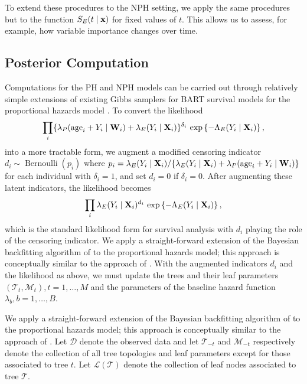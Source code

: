 \documentclass[12pt]{article}
\newcommand{\Bernoulli}{\operatorname{Bernoulli}}
\newcommand{\Data}{\mathcal D}
\newcommand{\Leaves}{\mathcal L}
\newcommand{\sM}{\mathcal M}
\newcommand{\Tree}{\mathcal T}
\newcommand{\bfW}{{\bf W}}
\newcommand{\bfX}{{\bf X}}
\newcommand{\bfx}{{\bf x}}
\begin{document}
To extend these procedures to the NPH setting, we apply the same procedures but to the function $S_E(t \mid \bfx)$ for fixed values of $t$. This allows us to assess, for example, how variable importance changes over time.

\subsection{Posterior Computation}
Computations for the PH and NPH models can be carried out through relatively
simple extensions of existing Gibbs samplers for BART survival models for the
proportional hazards model \citet{basak2021algorithm}. To convert the likelihood
$$
  \prod_i \{\lambda_P(\text{age}_i + Y_i \mid \bfW_i) + \lambda_E(Y_i \mid \bfX_i)\}^{\delta_i}
  \, \exp\left\{-\Lambda_E(Y_i \mid \bfX_i)\right\},
$$
into a more tractable form, we augment a modified censoring indicator $d_i \sim
\Bernoulli(p_i)$ where $p_i = \lambda_E(Y_i \mid \bfX_i) / \{\lambda_E(Y_i \mid
\bfX_i) + \lambda_P(\text{age}_i + Y_i \mid \bfW_i)\}$ for each individual with $\delta_i = 1$, and
set $d_i = 0$ if $\delta_i = 0$. After augmenting these latent indicators, the
likelihood becomes
\begin{equation}
\label{eq:lambda_likelihood}
  \prod_i \lambda_E(Y_i \mid \bfX_i)^{d_i}
  \, \exp\left\{-\Lambda_E(Y_i \mid \bfX_i)\right\},
\end{equation}
which is the standard likelihood form for survival analysis with $d_i$ playing
the role of the censoring indicator. We apply a straight-forward extension of the Bayesian backfitting algorithm of 
\citet{chipman2010bart} to the proportional hazards model; this approach is 
conceptually similar to the approach of \citet{linero2021bayesian}. With the augmented indicators $d_i$ and the likelihood as above, we must update the trees and their leaf parameters $(\Tree_t, \sM_t), t=1, \dots, M$ and the parameters of the baseline hazard function $\lambda_b, b=1, \dots, B.$


We apply a straight-forward extension of the Bayesian backfitting algorithm of 
\citet{chipman2010bart} to the proportional hazards model; this approach is 
conceptually similar to the approach of \citet{linero2021bayesian}. Let $\Data$ denote the observed data and let $\Tree_{-t}$ and $\sM_{-t}$  respectively denote the collection of all tree topologies and leaf parameters except for those associated to tree $t$. Let $\Leaves(\Tree)$ denote the collection of leaf nodes associated to tree $\Tree$.
\end{document}
